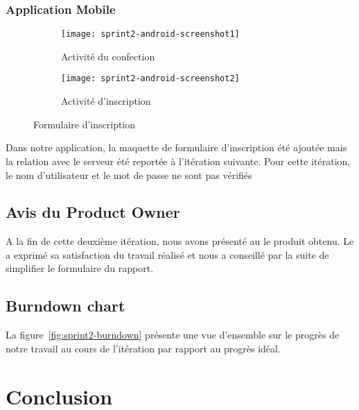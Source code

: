 \subsubsection{Application Mobile }

\begin{figure}[H]
\centering
    \begin{subfigure}{.45\textwidth}
        \centering
        \centering
        \texttt{[image: sprint2-android-screenshot1]}
        \caption{Activité du confection}
\label{fig:sprint2-android-screenshot1}
    \end{subfigure}
    \begin{subfigure}{.45\textwidth}
        \centering
        \centering
        \texttt{[image: sprint2-android-screenshot2]}
        \caption{Activité d'inscription}
\label{fig:sprint2-android-screenshot2}
    \end{subfigure}
    \caption{Formulaire d'inscription}
\end{figure}

Dans notre application, la maquette de formulaire d'inscription été ajoutée
mais la relation avec le serveur été reportée à l'itération suivante. Pour
cette itération, le nom d'utilisateur et le mot de passe ne sont pas vérifiés

\subsection{Avis du Product Owner}

A la fin de cette deuxième itération, nous avons présenté au  le produit obtenu. Le  a exprimé sa
satisfaction du travail réalisé et nous a conseillé par la suite de simplifier
le formulaire du rapport.

\subsection{Burndown chart}

La figure~\ref{fig:sprint2-burndown} présente une vue d'ensemble sur le progrès
de notre travail au cours de l'itération par rapport au progrès idéal.



\section*{Conclusion}

